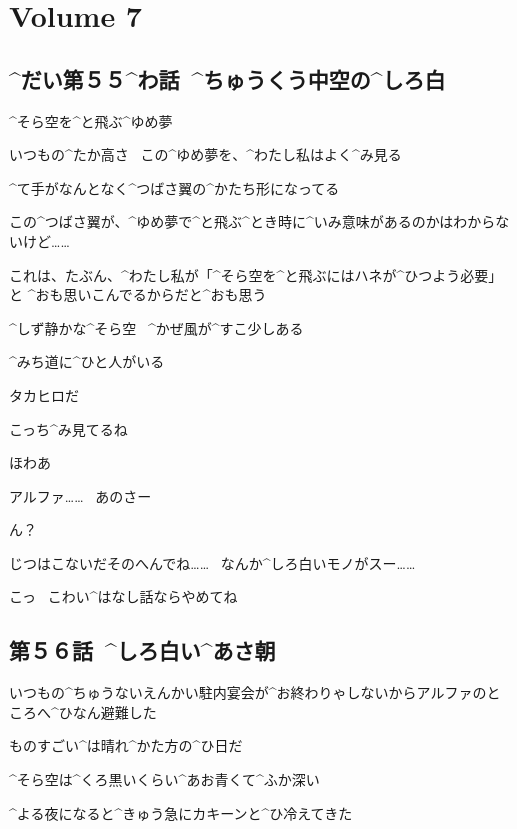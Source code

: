 \section{Volume 7}

\subsection{^{だい}{第}５５^{わ}{話}\ ^{ちゅうくう}{中空}の^{しろ}{白}}

\page[2]
\Alpha ^{そら}{空}を^{と}{飛}ぶ^{ゆめ}{夢}

\Alpha いつもの^{たか}{高}さ
\ この^{ゆめ}{夢}を、^{わたし}{私}はよく^{み}{見}る

\page[3]
\Alpha ^{て}{手}がなんとなく^{つばさ}{翼}の^{かたち}{形}になってる

\Alpha この^{つばさ}{翼}が、^{ゆめ}{夢}で^{と}{飛}ぶ^{とき}{時}に^{いみ}{意味}があるのかはわからないけど……

\Alpha これは、たぶん、^{わたし}{私}が「^{そら}{空}を^{と}{飛}ぶにはハネが^{ひつよう}{必要}」と
^{おも}{思}いこんでるからだと^{おも}{思}う

\page[4]
\Alpha ^{しず}{静}かな^{そら}{空}
\ ^{かぜ}{風}が^{すこ}{少}しある

\page[5]
\Alpha ^{みち}{道}に^{ひと}{人}がいる

\page[6]
\Alpha タカヒロだ

\Alpha こっち^{み}{見}てるね

\page[7]
\Alpha ほわあ

\page[8]
\Takahiro アルファ……
\ あのさー

\Alpha ん？

\Takahiro じつはこないだそのへんでね……
\ なんか^{しろ}{白}いモノがスー……

\Alpha こっ
\ こわい^{はなし}{話}ならやめてね


\subsection{第５６話\ ^{しろ}{白}い^{あさ}{朝}}

\page[10]
\Takahiro いつもの^{ちゅうないえんかい}{駐内宴会}が^{お}{終}わりゃしないからアルファのところへ^{ひなん}{避難}した

\Takahiro ものすごい^{は}{晴}れ^{かた}{方}の^{ひ}{日}だ

\Takahiro ^{そら}{空}は^{くろ}{黒}いくらい^{あお}{青}くて^{ふか}{深}い

\page[12]
\Takahiro ^{よる}{夜}になると^{きゅう}{急}にカキーンと^{ひ}{冷}えてきた

